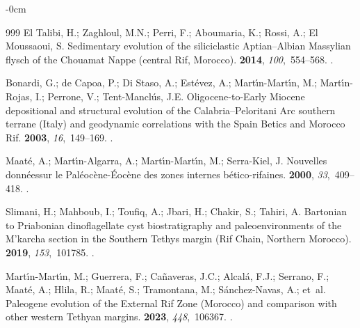 \documentclass[geomatics,article,accept,pdftex,oneauthor]{Definitions/mdpi}
\begin{document}
\begin{adjustwidth}{-\extralength}{0cm}
\begin{thebibliography}{999}
{El Talibi}, H.; Zaghloul, M.N.; Perri, F.; Aboumaria, K.; Rossi, A.; {El
  Moussaoui}, S.
\newblock Sedimentary evolution of the siliciclastic Aptian--Albian Massylian
  flysch of the Chouamat Nappe (central Rif, Morocco).
 {\bf 2014}, {\em
  100},~554--568.
.

Bonardi, G.; {de Capoa}, P.; {Di Staso}, A.; Est{\'e}vez, A.;
  Mart{\'\i}n-Mart{\'\i}n, M.; Mart{\'\i}n-Rojas, I.; Perrone, V.;
  Tent-Mancl{\'u}s, J.E.
\newblock Oligocene-to-Early Miocene depositional and structural evolution of
  the Calabria--Peloritani Arc southern terrane (Italy) and geodynamic
  correlations with the Spain Betics and Morocco Rif.
 {\bf 2003}, {\em 16},~149--169.
.

Maat{\'e}, A.; Mart{\'\i}n-Algarra, A.; Mart{\'\i}n-Mart{\'\i}n, M.;
  Serra-Kiel, J.
\newblock Nouvelles donn{\'e}essur le Pal{\'e}oc{\`e}ne-{\'E}oc{\`e}ne des
  zones internes b{\'e}tico-rifaines.
 {\bf 2000}, {\em 33},~409--418.
.

Slimani, H.; Mahboub, I.; Toufiq, A.; Jbari, H.; Chakir, S.; Tahiri, A.
\newblock Bartonian to Priabonian dinoflagellate cyst biostratigraphy and
  paleoenvironments of the M'karcha section in the Southern Tethys margin (Rif
  Chain, Northern Morocco).
 {\bf 2019}, {\em 153},~101785.
.

Mart{\'\i}n-Mart{\'\i}n, M.; Guerrera, F.; Ca{\~n}averas, J.C.; Alcal{\'a},
  F.J.; Serrano, F.; Maat{\'e}, A.; Hlila, R.; Maat{\'e}, S.; Tramontana, M.;
  S{\'a}nchez-Navas, A.;  et~al.
\newblock Paleogene evolution of the External Rif Zone (Morocco) and comparison
  with other western Tethyan margins.
 {\bf 2023}, {\em 448},~106367.
.


\end{thebibliography}
\end{adjustwidth}
\end{document}
